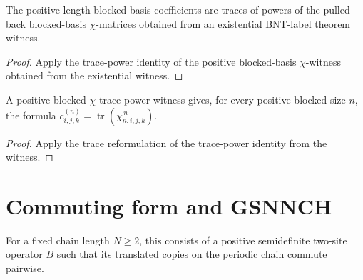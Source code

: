 \begin{theorem}%
    \label{thm:mpdo_bnt_label_theorem_witness_blocked_coeff_eq_positive_blocked_chi_trace_pow}
    \leanok
    The positive-length blocked-basis coefficients are traces of powers of the
    pulled-back blocked-basis $\chi$-matrices obtained from an existential
    BNT-label theorem witness.
\end{theorem}
\begin{proof}\leanok
    Apply the trace-power identity of the positive blocked-basis
    $\chi$-witness obtained from the existential witness.
\end{proof}

\begin{theorem}%
    \label{thm:mpdo_positive_blocked_structure_chi_eq_trace_matrix_pow}
    \leanok
    A positive blocked $\chi$ trace-power witness gives, for every positive
    blocked size $n$, the formula
    $c^{(n)}_{i,j,k}=\operatorname{tr}(\chi_{n,i,j,k}^{\,n})$.
\end{theorem}
\begin{proof}\leanok
    Apply the trace reformulation of the trace-power identity from the witness.
\end{proof}

\section{Commuting form and GSNNCH}

\begin{definition}
    \label{def:mpdo_commuting_form_data}
    \leanok
    For a fixed chain length $N \ge 2$, this consists of a positive
    semidefinite two-site operator $B$ such that its translated copies on the
    periodic chain commute pairwise.
\end{definition}

